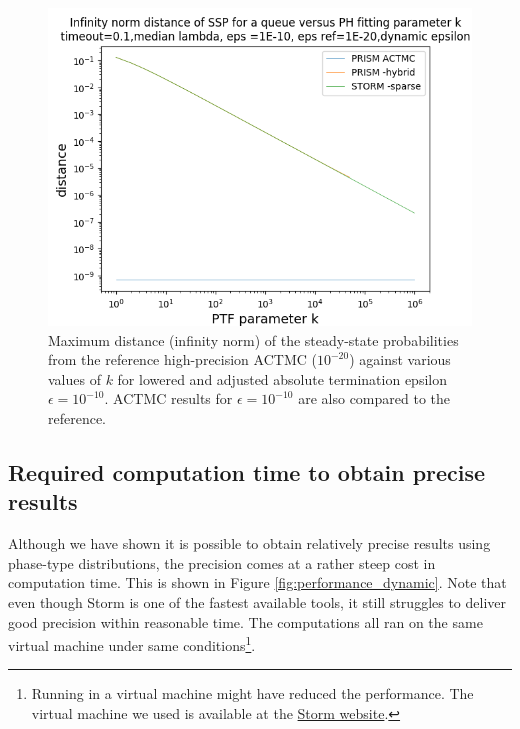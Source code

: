 \documentclass{article}
\numberwithin{equation}{section}		%
\numberwithin{figure}{section}			%
\numberwithin{table}{section}				%
\begin{document}
	\begin{figure}[H]
		\begin{center}
			\includegraphics[trim=0.2cm 0cm 0cm 1.35cm,width=15cm, clip]{picture/New_model/1E-10/distance_dynamic_1E-10.png}
		\end{center}
		\caption{Maximum distance (infinity norm) of the steady-state probabilities from the reference high-precision ACTMC ($10^{-20}$) against various values of $k$ for lowered and adjusted absolute termination epsilon $\epsilon = 10^{-10}$. ACTMC results for $\epsilon = 10^{-10}$ are also compared to the reference.}
		\label{fig:distance_dynamic_1E-10_constant_kappa}
	\end{figure}
	
	\subsection{Required computation time to obtain precise results}
	\label{computation_time}
	
	Although we have shown it is possible to obtain relatively precise results using phase-type distributions, the precision comes at a rather steep cost in computation time. This is shown in Figure \ref{fig:performance_dynamic}. Note that even though Storm is one of the fastest available tools, it still struggles to deliver good precision within reasonable time. The computations all ran on the same virtual machine under same conditions\footnote{Running in a virtual machine might have reduced the performance. The virtual machine we used is available at the \href{http://www.stormchecker.org/documentation/vm/vm.html}{Storm website}.}.
	
\end{document}
